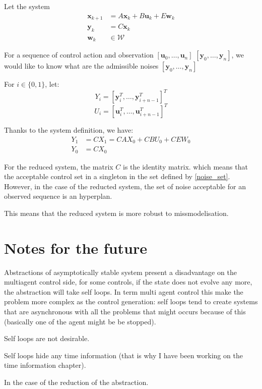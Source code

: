 \documentclass{article}
\theoremstyle{named}
\newcommand{\vect}[1]{\ensuremath{ \mathbf{#1}}}
\begin{document}
Let the system
\begin{align*}
\vect{x}_{k+1} &= A \vect{x}_{k} + B \vect{u}_{k} + E \vect{w}_{k}\\
\vect{y}_{k} &= C \vect{x}_k\\
\vect{w}_k &\in \mathcal{W}
\end{align*}

For a sequence of control action and observation $[\vect{u}_0,\dots,\vect{u}_n]$ $[\vect{y}_0,\dots,\vect{y}_n]$, we would like to know what are the admissible noises $[\vect{y}_0,\dots,\vect{y}_n]$

For $i \in \{ 0,1 \}$, let:
$$Y_i = [\vect{y}_i^T,\dots,\vect{y}_{i+n-1}^T]^T $$
$$U_i = [\vect{u}_i^T,\dots,\vect{u}_{i+n-1}^T]^T $$

Thanks to the system definition, we have:
\begin{align}\label{noise_set}
Y_1 &=  C X_1 = C A X_0 + C B U_0 + C E W_0\\
Y_0 &=  C X_0
\end{align}

For the reduced system, the matrix $C$ is the identity matrix. which means that the acceptable control set in a singleton in the set defined by \ref{noise_set}. However, in the case of the reducted system, the set of noise acceptable for an observed sequence is an hyperplan.

This means that the reduced system is more robust to missmodelisation.

\section{Notes for the future}
Abstractions of asymptotically stable system present a disadvantage on the multiagent control side, for some controls, if the state does not evolve any more, the abstraction will take self loops.
In term multi agent control this make the problem more complex as the control generation: self loops tend to create systems that are asynchronous with all the problems that might occurs because of this (basically one of the agent might be be stopped).

Self loops are not desirable.

Self loops hide any time information (that is why I have been working on the time information chapter).

In the case of the reduction of the abstraction.

{}

\end{document}
